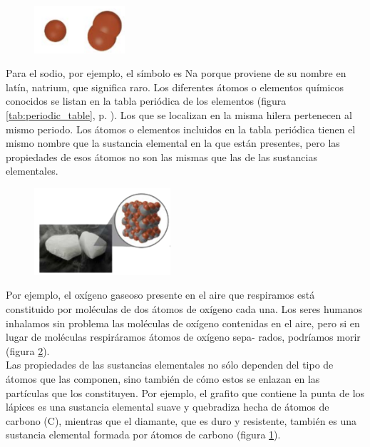 \documentclass[11pt]{book}
\begin{document}
\begin{figure}
  \centering
  \includegraphics[width=0.3\textwidth]{atomos07.png}
  \label{fig:atomos07}
\end{figure}

Para el sodio, por ejemplo, el símbolo es Na porque proviene de su nombre en latín, natrium, que significa raro.
Los diferentes átomos o elementos químicos conocidos se listan en la
tabla periódica de los elementos (figura \ref{tab:periodic_table}, p. \pageref{tab:periodic_table}). Los que se localizan en la misma hilera pertenecen
al mismo periodo. Los átomos o elementos incluidos en la tabla periódica tienen el mismo
nombre que la sustancia elemental en la que están presentes, pero las propiedades de esos átomos no son
las mismas que las de las sustancias elementales.\\

\begin{figure}
  \centering
  \includegraphics[width=0.45\textwidth]{atomos06.png}
  \label{fig:atomos06}
\end{figure}

Por ejemplo, el oxígeno gaseoso presente en el aire que respiramos
está constituido por moléculas de dos átomos de oxígeno cada una. Los seres
humanos inhalamos sin problema las moléculas de oxígeno contenidas en
el aire, pero si en lugar de moléculas respiráramos átomos de oxígeno sepa-
rados, podríamos morir (figura \ref{fig:atomos06}).\\

Las propiedades de las sustancias elementales no sólo dependen del tipo de átomos que las componen, sino también
de cómo estos se enlazan en las partículas que los constituyen.
Por ejemplo, el grafito que contiene la punta de los lápices
es una sustancia elemental suave y quebradiza hecha de
átomos de carbono (C), mientras que el diamante, que es duro
y resistente, también es una sustancia elemental formada por
átomos de carbono (figura \ref{fig:atomos07}).\\
\end{document}
